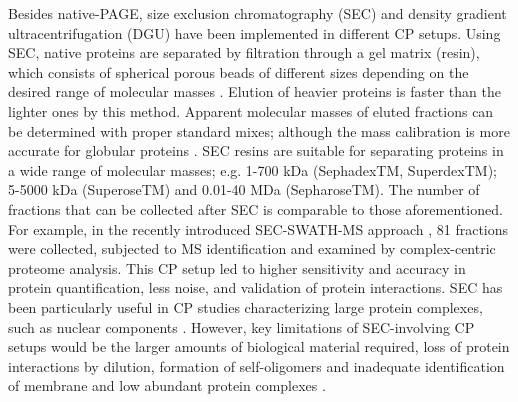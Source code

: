 Besides native-PAGE, size exclusion chromatography (SEC) and density gradient ultracentrifugation (DGU) have been implemented in different CP setups. Using SEC, native proteins are separated by filtration through a gel matrix (resin), which consists of spherical porous beads of different sizes depending on the desired range of molecular masses \cite{Burgess_2018}. Elution of heavier proteins is faster than the lighter ones by this method. Apparent molecular masses of eluted fractions can be determined with proper standard mixes; although the mass calibration is more accurate for globular proteins \cite{Hong_2012, Korepanova_2012}. SEC resins are suitable for separating proteins in a wide range of molecular masses; e.g. 1-700 kDa (SephadexTM, SuperdexTM); 5-5000 kDa (SuperoseTM) and 0.01-40 MDa (SepharoseTM). The number of fractions that can be collected after SEC is comparable to those aforementioned. For example, in the recently introduced SEC-SWATH-MS approach \cite{Heusel_2019}, 81 fractions were collected, subjected to MS identification and examined by complex-centric proteome analysis. This CP setup led to higher sensitivity and accuracy in protein quantification, less noise, and validation of protein interactions. SEC has been particularly useful in CP studies characterizing large protein complexes, such as nuclear components \cite{Connelly_2018}. However, key limitations of SEC-involving CP setups would be the larger amounts of biological material required, loss of protein interactions by dilution, formation of self-oligomers and inadequate identification of membrane and low abundant protein complexes \cite{Burgess_2018, Heusel_2019, Iacobucci_2021}.

